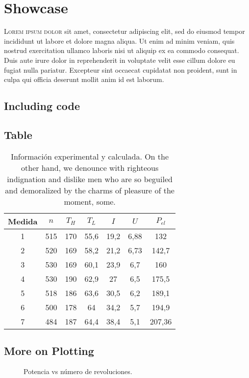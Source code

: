 

\chapter{Showcase}\label{cha:showcase}



\lettrine{L}{orem ipsum dolor} sit amet, consectetur adipiscing elit, sed do
eiusmod tempor incididunt ut labore et dolore magna aliqua. Ut enim ad minim
veniam, quis nostrud exercitation ullamco laboris nisi ut aliquip ex ea commodo
consequat. Duis aute irure dolor in reprehenderit in voluptate velit esse
cillum dolore eu fugiat nulla pariatur. Excepteur sint occaecat cupidatat non
proident, sunt in culpa qui officia deserunt mollit anim id est laborum.


\section{Including code}



\section{Table}

\begin{table}[ht]
  \centering
  \renewcommand{\arraystretch}{1.25}
  \setlength{\tabcolsep}{1.5\tabcolsep}
  \caption{Información experimental y calculada. On the other hand, we denounce
    with righteous indignation and dislike men who are so beguiled and
    demoralized by the charms of pleasure of the moment, some.}\label{tab:info}
  \begin{tabular}{*7c} \toprule
    Medida & $n$ & $T_H$ & $T_L$ & $I$ & $U$ & $P_{el}$ \\
    \midrule
    1  & 515 & 170 & 55,6 & 19,2  & 6,88 & 132    \\
    2  & 520 & 169 & 58,2 & 21,2  & 6,73 & 142,7  \\
    3  & 530 & 169 & 60,1 & 23,9  & 6,7  & 160    \\
    4  & 530 & 190 & 62,9 & 27    & 6,5  & 175,5  \\
    5  & 518 & 186 & 63,6 & 30,5  & 6,2  & 189,1  \\
    6  & 500 & 178 & 64   & 34,2  & 5,7  & 194,9  \\
    7  & 484 & 187 & 64,4 & 38,4  & 5,1  & 207,36 \\
    \bottomrule
  \end{tabular}
\end{table}



\section{More on Plotting}

\begin{figure}[p]
  \centering
  
  \caption{Potencia vs número de revoluciones.}\label{fig:pot}
\end{figure}